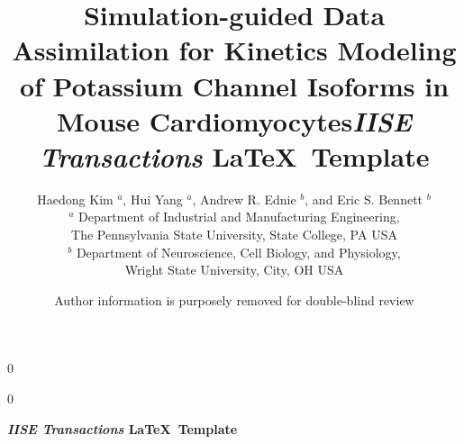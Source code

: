 \documentclass[11pt]{article}
\newcommand{\blind}{0}
\begin{document}
	
	\def\spacingset#1{\renewcommand{\baselinestretch}%
		{#1}\small\normalsize} \spacingset{1}
	
	\blind
	{
		\title{\bf Simulation-guided Data Assimilation for Kinetics Modeling of Potassium Channel Isoforms in Mouse Cardiomyocytes}
		\author{Haedong Kim $^a$, Hui Yang $^a$, Andrew R. Ednie $^b$, and Eric S. Bennett $^b$ \\
		$^a$ Department of Industrial and Manufacturing Engineering, \\
		The Pennsylvania State University, State College, PA USA \\
        $^b$ Department of Neuroscience, Cell Biology, and Physiology, \\
        Wright State University, City, OH USA}
		\date{}
		\maketitle
	} \fi
	
	\blind
	{
        \title{\bf \emph{IISE Transactions} \LaTeX \ Template}
		\author{Author information is purposely removed for double-blind review}
		
\bigskip
		\bigskip
		\bigskip
		\begin{center}
			{\LARGE\bf \emph{IISE Transactions} \LaTeX \ Template}
		\end{center}
		\medskip
	} \fi
	\bigskip
		
\end{document}
